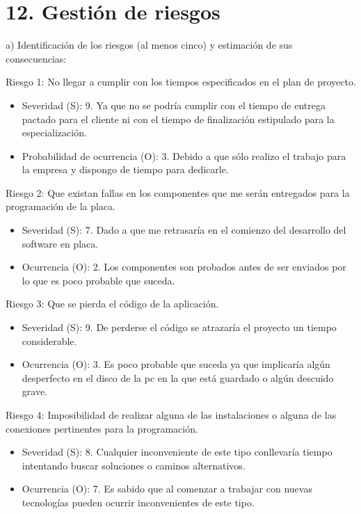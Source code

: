 \documentclass[11pt]{charter}
\begin{document}
\section{12. Gestión de riesgos}
\label{sec:riesgos}

a) Identificación de los riesgos (al menos cinco) y estimación de sus consecuencias:
 
Riesgo 1: No llegar a cumplir con los tiempos especificados en el plan de proyecto.
\begin{itemize}
\item Severidad (S): 9. Ya que no se podría cumplir con el tiempo de entrega pactado para el cliente ni con el tiempo de finalización estipulado para la especialización.
\item Probabilidad de ocurrencia (O): 3. Debido a que sólo realizo el trabajo para la empresa y dispongo de tiempo para dedicarle.
\end{itemize}   

Riesgo 2: Que existan fallas en los componentes que me serán entregados para la programación de la placa.
\begin{itemize}
\item Severidad (S): 7. Dado a que me retrasaría en el comienzo del desarrollo del software en placa. 
\item Ocurrencia (O): 2. Los componentes son probados antes de ser enviados por lo que es poco probable que suceda.
\end{itemize}

Riesgo 3: Que se pierda el código de la aplicación.
\begin{itemize}
\item Severidad (S): 9. De perderse el código se atrazaría el proyecto un tiempo considerable.
\item Ocurrencia (O): 3. Es poco probable que suceda ya que implicaría algún desperfecto en el disco de la pc en la que está guardado o algún descuido grave.
\end{itemize}

Riesgo 4: Imposibilidad de realizar alguna de las instalaciones o alguna de las conexiones pertinentes para la programación.
\begin{itemize}
\item Severidad (S): 8. Cualquier inconveniente de este tipo conllevaría tiempo intentando buscar soluciones o caminos alternativos.
\item Ocurrencia (O): 7. Es sabido que al comenzar a trabajar con nuevas tecnologías pueden ocurrir inconvenientes de este tipo.
\end{itemize}
\end{document}
